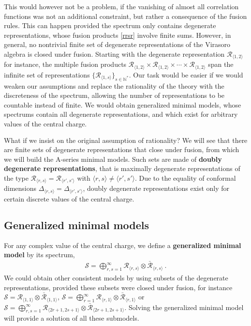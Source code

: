 \documentclass[12pt, a4paper, notitlepage, twoside]{report}
\numberwithin{equation}{section}
\theoremstyle{break}
\begin{document}
This would however not be a problem, if the vanishing of almost all correlation functions was not an additional constraint, but rather a consequence of the fusion rules.
This can happen provided the spectrum only contains degenerate representations, whose fusion products \eqref{rrsr} involve finite sums. 
However, in general, no nontrivial finite set of degenerate representations of the Virasoro algebra is closed under fusion.
Starting with the degenerate representation $\mathcal{R}_{\langle 1,2 \rangle}$ for instance, the multiple fusion products $\mathcal{R}_{\langle 1,2 \rangle}\times \mathcal{R}_{\langle 1,2 \rangle}\times \cdots \times \mathcal{R}_{\langle 1,2 \rangle}$ span the infinite set of representations $\{\mathcal{R}_{\langle 1,s \rangle}\}_{s\in{\mathbb{N}}^*}$.
Our task would be easier if we would weaken our assumptions and replace the rationality of the theory with the discreteness of the spectrum, allowing the number of representations to be countable instead of finite.
We would obtain generalized minimal models, whose spectrums contain all degenerate representations, and which exist for arbitrary values of the central charge. 

What if we insist on the original assumption of rationality? We will see that there are finite sets 
of degenerate representations that close under fusion, from which we will build the A-series minimal models.
Such sets are made of
\textbf{\boldmath doubly degenerate representations}, that is maximally degenerate representations of the type $\mathcal{R}_{\langle r,s \rangle}=\mathcal{R}_{\langle r',s' \rangle}$ with $\langle r,s \rangle\neq \langle r',s' \rangle$. Due to the 
equality of conformal dimensions $\Delta_{\langle r,s \rangle}=\Delta_{\langle r',s' \rangle}$, doubly degenerate representations exist only for certain discrete values of the central charge. 

\subsection{Generalized minimal models}

For any complex value of the central charge, we define a \textbf{\boldmath generalized minimal model} by its spectrum,
\begin{align}
 \boxed{\mathcal{S} = \bigoplus_{r,s=1}^\infty \mathcal{R}_{\langle r,s \rangle}\otimes \bar{\mathcal{R}}_{\langle r,s \rangle}}\ .
\end{align}
We could obtain other consistent models by using subsets of the degenerate representations, provided these subsets were closed under fusion, for instance $\mathcal{S}=\mathcal{\mathcal{R}}_{\langle 1,1 \rangle}\otimes \bar{\mathcal{R}}_{\langle 1,1 \rangle}$, $\mathcal{S}=\bigoplus_{r=1}^\infty \mathcal{R}_{\langle r,1 \rangle}\otimes \bar{\mathcal{R}}_{\langle r,1 \rangle}$ or $\mathcal{S}=\bigoplus_{r,s=1}^{\infty} \mathcal{R}_{\langle 2r+1,2s+1 \rangle}\otimes \bar{\mathcal{R}}_{\langle 2r+1,2s+1 \rangle}$.
Solving the generalized minimal model will provide a solution of all these submodels. 
\end{document}
